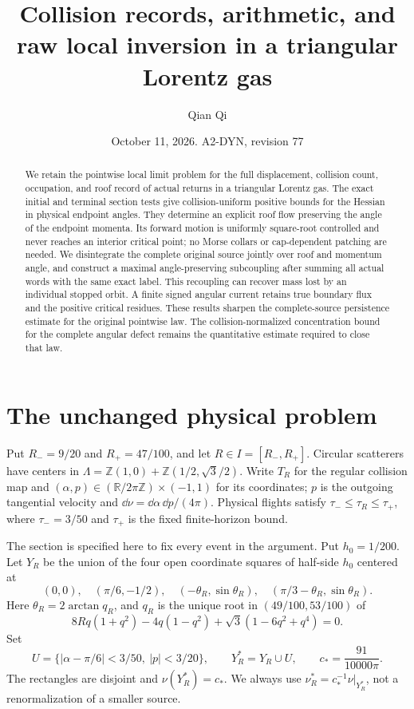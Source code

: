 \documentclass[11pt,reqno]{amsart}
\title[Collision records and raw local inversion]{Collision records, arithmetic, and raw local inversion in a triangular Lorentz gas}
\author{Qian Qi}
\date{October 11, 2026. A2-DYN, revision 77}
\numberwithin{equation}{section}
\theoremstyle{definition}
\theoremstyle{remark}\newtheorem{remark}[theorem]{Remark}
\newcommand{\R}{\mathbb R}\newcommand{\Z}{\mathbb Z}
\begin{document}
\raggedbottom
\begin{abstract}
We retain the pointwise local limit problem for the full displacement,
collision count, occupation, and roof record of actual returns in a
triangular Lorentz gas. The exact initial and terminal section tests
give collision-uniform positive bounds for the Hessian in physical
endpoint angles. They determine an explicit roof flow preserving the
angle of the endpoint momenta. Its forward motion is uniformly
square-root controlled and never reaches an interior critical point;
no Morse collars or cap-dependent patching are needed. We disintegrate
the complete original source jointly over roof and momentum angle,
and construct a maximal angle-preserving subcoupling after summing
all actual words with the same exact label. This recoupling can recover
mass lost by an individual stopped orbit. A finite signed angular
current retains true boundary flux and the positive critical residues.
These results sharpen the complete-source persistence estimate for
the original pointwise law. The collision-normalized concentration
bound for the complete angular defect remains the quantitative
estimate required to close that law.
\end{abstract}
\maketitle

\section{The unchanged physical problem}
Put $R_-=9/20$ and $R_+=47/100$, and let $R\in I=[R_-,R_+]$. Circular scatterers have centers in
$\Lambda=\Z(1,0)+\Z(1/2,\sqrt3/2)$. Write $T_R$ for the regular
collision map and $(\alpha,p)\in(\R/2\pi\Z)\times(-1,1)$ for its
coordinates; $p$ is the outgoing tangential velocity and
$\dd\nu=\dd\alpha\,\dd p/(4\pi)$. Physical flights satisfy
$\tau_-\le\tau_R\le\tau_+$, where $\tau_-=3/50$ and $\tau_+$
is the fixed finite-horizon bound.

The section is specified here to fix every event in the argument.
Put $h_0=1/200$. Let $Y_R$ be the union of the four open coordinate
squares of half-side $h_0$ centered at
\[
 (0,0),\quad(\pi/6,-1/2),\quad
 (-\theta_R,\sin\theta_R),\quad
 (\pi/3-\theta_R,\sin\theta_R).
\]
Here $\theta_R=2\arctan q_R$, and $q_R$ is the unique root in
$(49/100,53/100)$ of
\[
 8Rq(1+q^2)-4q(1-q^2)+\sqrt3(1-6q^2+q^4)=0.
\]
Set
\[
 U=\{|\alpha-\pi/6|<3/50,\ |p|<3/20\},\qquad
 Y_R^*=Y_R\cup U,\qquad c_*=\frac{91}{10000\pi}.
\]
The rectangles are disjoint and $\nu(Y_R^*)=c_*$. We always use
$\nu_R^*=c_*^{-1}\nu|_{Y_R^*}$, not a renormalization of a smaller
source.
\end{document}
